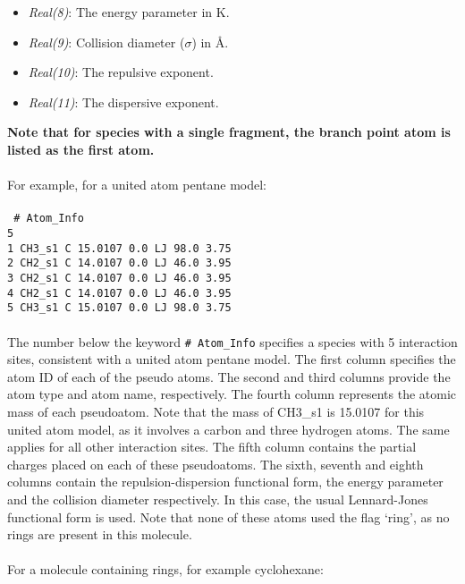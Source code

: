 \begin{itemize}
\item {\it Real(8)}: The energy parameter in K.
%
\item {\it Real(9)}: Collision diameter ($\sigma$)  in \AA.
%
\item {\it Real(10)}: The repulsive exponent.
%
\item {\it Real(11)}: The dispersive exponent.
\end{itemize}
%
%
{\bf Note that for species with a single fragment, the branch point atom
 is listed as the first atom.} \\ \\
%
For example, for a united atom pentane model: \\ \\
%
\texttt{
\# Atom\_Info\\
5\\
1    CH3\_s1    C    15.0107    0.0    LJ    98.0    3.75\\
2    CH2\_s1    C    14.0107    0.0    LJ    46.0    3.95\\
3    CH2\_s1    C    14.0107    0.0    LJ    46.0    3.95\\
4    CH2\_s1    C    14.0107    0.0    LJ    46.0    3.95\\
5    CH3\_s1    C    15.0107    0.0    LJ    98.0    3.75\\
} \\
%
The number below the keyword \texttt{\# Atom\_Info} specifies a species with 5 interaction sites, consistent with a united atom pentane model.
The first column specifies the atom ID of each of the pseudo atoms.
The second and third columns provide the atom type and atom name, respectively.
The fourth column represents the atomic mass of each pseudoatom. Note that the mass of
CH3\_s1 is 15.0107 for this united atom model, as it involves a carbon and three hydrogen atoms.
The same applies for all other interaction sites.
The fifth column contains the partial charges placed on each of these pseudoatoms.
The sixth, seventh and eighth columns contain the repulsion-dispersion functional form,
the energy parameter and the collision diameter respectively.
In this case, the usual Lennard-Jones functional form is used.
Note that none of these atoms used the flag `ring', as no rings
are present in this molecule. \\ \\
%
For a molecule containing rings, for example cyclohexane: \\ \\
